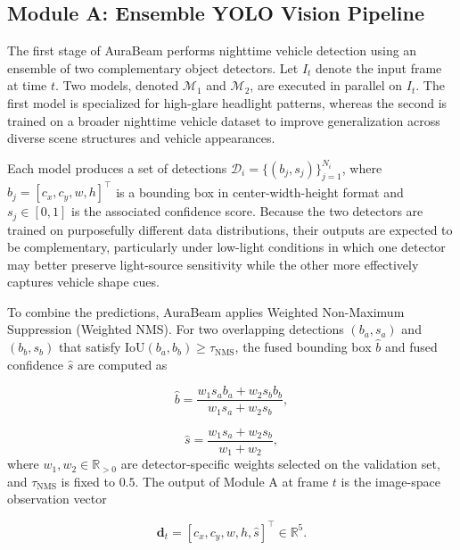 \documentclass[pdflatex,sn-mathphys-num]{sn-jnl}%
\theoremstyle{thmstyleone}%
\theoremstyle{thmstyletwo}%
\theoremstyle{thmstylethree}%
\begin{document}
\subsection{Module A: Ensemble YOLO Vision Pipeline}
\label{subsec:yolo}

The first stage of AuraBeam performs nighttime vehicle detection using an ensemble of two complementary object detectors. Let $I_t$ denote the input frame at time $t$. Two models, denoted $\mathcal{M}_1$ and $\mathcal{M}_2$, are executed in parallel on $I_t$. The first model is specialized for high-glare headlight patterns, whereas the second is trained on a broader nighttime vehicle dataset to improve generalization across diverse scene structures and vehicle appearances.

Each model produces a set of detections $\mathcal{D}_i = \{(b_j, s_j)\}_{j=1}^{N_i}$, where $b_j = [c_x, c_y, w, h]^\top$ is a bounding box in center-width-height format and $s_j \in [0,1]$ is the associated confidence score. Because the two detectors are trained on purposefully different data distributions, their outputs are expected to be complementary, particularly under low-light conditions in which one detector may better preserve light-source sensitivity while the other more effectively captures vehicle shape cues.

To combine the predictions, AuraBeam applies Weighted Non-Maximum Suppression (Weighted NMS). For two overlapping detections $(b_a, s_a)$ and $(b_b, s_b)$ that satisfy $\mathrm{IoU}(b_a, b_b) \geq \tau_{\mathrm{NMS}}$, the fused bounding box $\hat{b}$ and fused confidence $\hat{s}$ are computed as

\begin{equation}
\hat{b} = \frac{w_1 s_a b_a + w_2 s_b b_b}{w_1 s_a + w_2 s_b},
\label{eq:nms_box}
\end{equation}

\begin{equation}
\hat{s} = \frac{w_1 s_a + w_2 s_b}{w_1 + w_2},
\label{eq:nms_score}
\end{equation}
where $w_1, w_2 \in \mathbb{R}_{>0}$ are detector-specific weights selected on the validation set, and $\tau_{\mathrm{NMS}}$ is fixed to $0.5$. The output of Module A at frame $t$ is the image-space observation vector

\begin{equation}
\mathbf{d}_t = [c_x, c_y, w, h, \hat{s}]^\top \in \mathbb{R}^5.
\label{eq:det_vec}
\end{equation}
\end{document}

